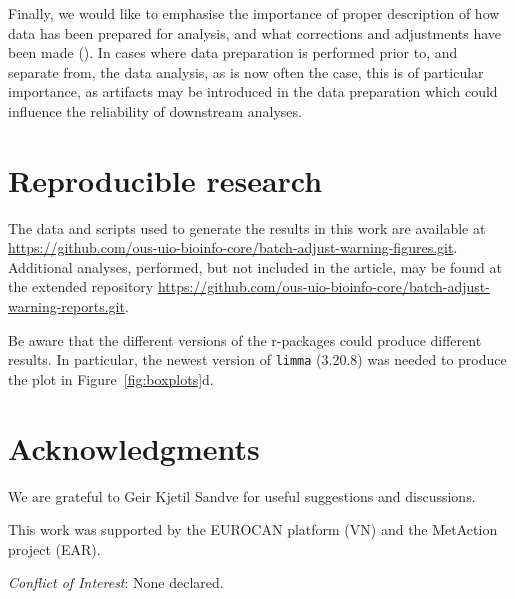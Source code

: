 \documentclass[oupdraft]{bio}
\begin{document}
Finally, we would like to emphasise the importance of proper description of how data has been prepared for analysis, and what corrections and adjustments have been made (\citealp{Sandve2013}). In cases where data preparation is performed prior to, and separate from, the data analysis, as is now often the case, this is of particular importance, as artifacts may be introduced in the data preparation which could influence the reliability of downstream analyses.





\section*{Reproducible research}

The data and scripts used to generate the results in this work are available at
\href{https://github.com/ous-uio-bioinfo-core/batch-adjust-warning-figures.git}{https://github.com/ous-uio-bioinfo-core/batch-adjust-warning-figures.git}.
Additional analyses, performed, but not included in the article, may be found at the extended repository 
\href{https://github.com/ous-uio-bioinfo-core/batch-adjust-warning-reports.git}{https://github.com/ous-uio-bioinfo-core/batch-adjust-warning-reports.git}.

Be aware that the different versions of the r-packages could produce different results. In particular, the newest version of \texttt{limma} (3.20.8) was needed to produce the plot in Figure~\ref{fig:boxplots}d.


\section*{Acknowledgments}

We are grateful to Geir Kjetil Sandve for useful suggestions and discussions. 

This work was supported by the EUROCAN platform (VN) and the MetAction project (EAR).

{\it Conflict of Interest}: None declared.



%
\end{document}
